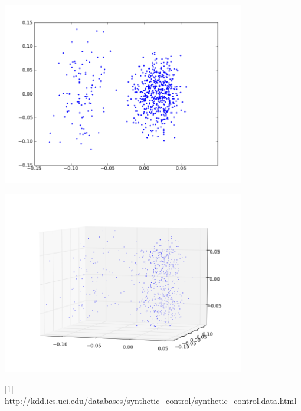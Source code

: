 \documentclass[12pt,fleqn]{article}\usepackage{../common}
\begin{document}
\includegraphics[height=8cm]{2d.png}



\includegraphics[height=8cm]{3d.png}



[1] http://kdd.ics.uci.edu/databases/synthetic\_control/synthetic\_control.data.html
\end{document}

